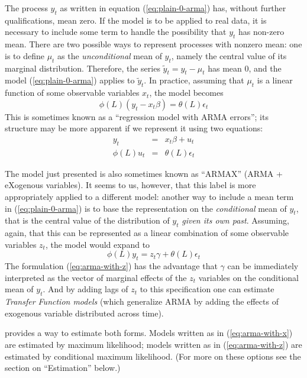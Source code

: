 The process $y_t$ as written in equation (\ref{eq:plain-0-arma}) has,
without further qualifications, mean zero. If the model is to be
applied to real data, it is necessary to include some term to handle
the possibility that $y_t$ has non-zero mean. There are two possible
ways to represent processes with nonzero mean: one is to define $\mu_t$
as the \emph{unconditional} mean of $y_t$, namely the central value of
its marginal distribution. Therefore, the series $\tilde{y}_t = y_t -
\mu_t$ has mean 0, and the model (\ref{eq:plain-0-arma}) applies to
$\tilde{y}_t$. In practice, assuming that $\mu_t$ is a linear function
of some observable variables $x_t$, the model becomes
\begin{equation}
  \label{eq:arma-with-x}
  \phi(L) (y_t - x_t \beta) = \theta(L) \epsilon_t
\end{equation}
This is sometimes known as a ``regression model with ARMA errors'';
its structure may be more apparent if we represent it using two
equations:
\begin{eqnarray*}
  y_t & = & x_t \beta + u_t \\
  \phi(L) u_t & = & \theta(L) \epsilon_t
\end{eqnarray*}

The model just presented is also sometimes known as ``ARMAX'' (ARMA +
eXogenous variables).  It seems to us, however, that this label is
more appropriately applied to a different model: another way to
include a mean term in (\ref{eq:plain-0-arma}) is to base the
representation on the \emph{conditional} mean of $y_t$, that is the
central value of the distribution of $y_t$ \emph{given its own past}.
Assuming, again, that this can be represented as a linear combination
of some observable variables $z_t$, the model would expand to
\begin{equation}
  \label{eq:arma-with-z}
  \phi(L) y_t = z_t \gamma + \theta(L) \epsilon_t
\end{equation}
The formulation (\ref{eq:arma-with-z}) has the advantage that $\gamma$
can be immediately interpreted as the vector of marginal effects of
the $z_t$ variables on the conditional mean of $y_t$.  And by adding
lags of $z_t$ to this specification one can estimate \emph{Transfer
  Function models} (which generalize ARMA by adding the effects of
exogenous variable distributed across time).

 provides a way to estimate both forms. Models written as
in (\ref{eq:arma-with-x}) are estimated by maximum likelihood; models
written as in (\ref{eq:arma-with-z}) are estimated by conditional
maximum likelihood. (For more on these options see the section on
``Estimation'' below.)  


